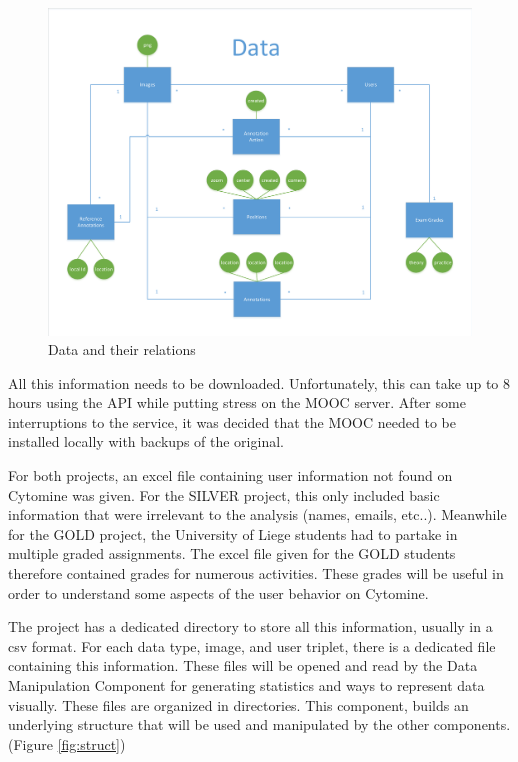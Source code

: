 \documentclass[a4paper,11pt]{report}
\numberwithin{figure}{section} %
\begin{document}
       \begin{figure}[H]
        \centering
         \includegraphics[width=.9\linewidth]{diagrams/dataDiagram.pdf}
         \caption{Data and their relations}
         \label{fig:data}
       \end{figure}

        
		All this information needs to be downloaded.
		Unfortunately, this can take up to 8 hours using the API while putting stress on the MOOC server.
		After some interruptions to the service, it was decided that the MOOC needed to be installed locally with backups of the original. \newline
        
        For both projects, an excel file containing user information not found on Cytomine was given.
        For the SILVER project, this only included basic information that were irrelevant to the analysis (names, emails, etc..).
        Meanwhile for the GOLD project, the University of Liege students had to partake in multiple graded assignments.
        The excel file given for the GOLD students therefore contained grades for numerous activities.
        These grades will be useful in order to understand some aspects of the user behavior on Cytomine. \newline
        
        
        The project has a dedicated directory to store all this information, usually in a csv format.
        For each data type, image, and user triplet, there is a dedicated file containing this information.
        These files will be opened and read by the Data Manipulation Component for generating statistics and ways to represent data visually.
        These files are organized in directories.
        This component, builds an underlying structure that will be used and manipulated by the other components. (Figure \ref{fig:struct})
        
\end{document}
